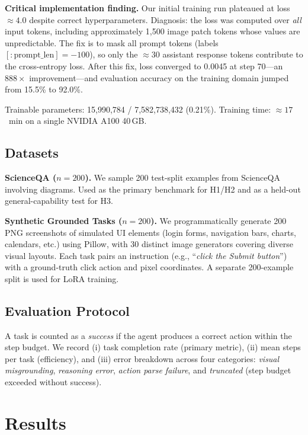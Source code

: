 \documentclass[10pt,twocolumn]{article}
\begin{document}
\textbf{Critical implementation finding.}
Our initial training run plateaued at loss ${\approx}4.0$ despite correct hyperparameters.
Diagnosis: the loss was computed over \emph{all} input tokens, including approximately 1,500
image patch tokens whose values are unpredictable. The fix is to mask all prompt tokens
(labels$[{:}\text{prompt\_len}] = -100$), so only the ${\approx}30$ assistant response tokens
contribute to the cross-entropy loss. After this fix, loss converged to 0.0045 at step 70---an
$888{\times}$ improvement---and evaluation accuracy on the training domain jumped from 15.5\%
to 92.0\%.

Trainable parameters: 15,990,784 / 7,582,738,432 (0.21\%). Training time: ${\approx}17$~min
on a single NVIDIA A100 40\,GB.

\subsection{Datasets}

\textbf{ScienceQA ($n{=}200$).}
We sample 200 test-split examples from ScienceQA involving diagrams. Used as the primary
benchmark for H1/H2 and as a held-out general-capability test for H3.

\textbf{Synthetic Grounded Tasks ($n{=}200$).}
We programmatically generate 200 PNG screenshots of simulated UI elements (login forms,
navigation bars, charts, calendars, etc.) using Pillow, with 30 distinct image generators
covering diverse visual layouts. Each task pairs an instruction (e.g.,
``\textit{click the Submit button}'') with a ground-truth click action and pixel coordinates.
A separate 200-example split is used for LoRA training.

\subsection{Evaluation Protocol}

A task is counted as a \emph{success} if the agent produces a correct action within the step
budget. We record (i) task completion rate (primary metric), (ii) mean steps per task
(efficiency), and (iii) error breakdown across four categories:
\emph{visual misgrounding}, \emph{reasoning error}, \emph{action parse failure},
and \emph{truncated} (step budget exceeded without success).

\section{Results}
\end{document}
